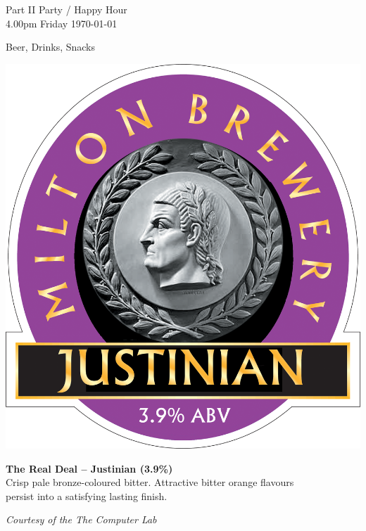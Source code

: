 \documentclass[a4paper,portrait]{article}
\begin{document}
\thispagestyle{empty}

\begin{center}

    {\Large Part II Party / Happy Hour} \\ \smallskip
    {\large 4.00pm Friday \today}

    \vfill

    {\huge Beer, Drinks, Snacks}\\ \bigskip \bigskip

    \vfill

    \includegraphics[width=0.5\linewidth]{fig/justinian.png} \bigskip \bigskip

    \textbf{\Large The Real Deal -- Justinian (3.9\%)} \\ \bigskip
    {\large Crisp pale bronze-coloured bitter. Attractive bitter orange flavours \\ persist into a satisfying lasting finish.}

    \vfill

    \textit{\Large Courtesy of the The Computer Lab}

\end{center}

\medskip
\end{document}
